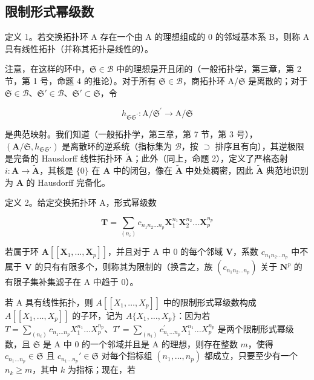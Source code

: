 \subsection{限制形式幂级数}

定义 1。若交换拓扑环 A 存在一个由 A 的理想组成的 0 的邻域基本系 B，则称 A 具有线性拓扑（并称其拓扑是线性的）。

注意，在这样的环中，\(\mathfrak{S} \in \mathcal{B}\) 中的理想是开且闭的（一般拓扑学，第三章，第 2 节，第 1 号，命题 4 的推论）。对于所有 \(\mathfrak{S} \in \mathcal{B}\)，商拓扑环 A/\(\mathfrak{S}\) 是离散的；对于 \(\mathfrak{S} \in \mathcal{B}\)、\(\mathfrak{S}' \in \mathcal{B}\)、\(\mathfrak{S}' \subset \mathfrak{S}\)，令

\[
h _ {\mathfrak {S S} ^ {\prime}} \colon \mathrm{A} / \mathfrak {S} ^ {\prime} \rightarrow \mathrm{A} / \mathfrak {S}
\]

是典范映射。我们知道（一般拓扑学，第三章，第 7 节，第 3 号），\((\mathbf{A} / \mathfrak{S}, h_{\mathfrak{S}\mathfrak{S}'})\) 是离散环的逆系统（指标集为 \(\mathcal{B}\)，按 \(\supset\) 排序且有向），其逆极限是完备的 Hausdorff 线性拓扑环 \(\tilde{\mathbf{A}}\)；此外（同上，命题 2），定义了严格态射 \(i: \mathbf{A} \to \tilde{\mathbf{A}}\)，其核是 \(\{0\}\) 在 \(\mathbf{A}\) 中的闭包，像在 \(\tilde{\mathbf{A}}\) 中处处稠密，因此 \(\tilde{\mathbf{A}}\) 典范地识别为 \(\mathbf{A}\) 的 Hausdorff 完备化。

定义 2。给定交换拓扑环 A，形式幂级数

\[
\mathbf {T} = \sum_ {(n _ {i})} c _ {n _ {1} n _ {2} \dots n _ {p}} \mathbf {X} _ {1} ^ {n _ {1}} \mathbf {X} _ {2} ^ {n _ {2}} \dots \mathbf {X} _ {p} ^ {n _ {p}}
\]

若属于环 \(\mathbf{A}[[\mathbf{X}_1,\ldots ,\mathbf{X}_p]]\)，并且对于 A 中 0 的每个邻域 \(\mathbf{V}\)，系数 \(c_{n_1n_2\dots n_p}\) 中不属于 \(\mathbf{V}\) 的只有有限多个，则称其为限制的（换言之，族 \((c_{n_1n_2\dots n_p})\) 关于 \(\mathbf{N}^p\) 的有限子集补集滤子在 A 中趋于 0）。

若 A 具有线性拓扑，则 \(A[[X_{1},\ldots,X_{p}]]\) 中的限制形式幂级数构成 \(A[[X_{1},\ldots,X_{p}]]\) 的子环，记为 \(A\{X_{1},\ldots,X_{p}\}\)：因为若 \(T=\sum_{(n_{i})}c_{n_{1}\ldots n_{p}}X_{1}^{n_{1}}\ldots X_{p}^{n_{p}}\)、\(T'=\sum_{(n_{i})}c_{n_{1}\ldots n_{p}}^{'}X_{1}^{n_{1}}\ldots X_{p}^{n_{p}}\) 是两个限制形式幂级数，且 \(\mathfrak{S}\) 是 A 中 0 的一个邻域并且是 A 的理想，则存在整数 \(m\)，使得 \(c_{n_1\ldots n_p} \in \mathfrak{S}\) 且 \(c_{n_1\ldots n_p}' \in \mathfrak{S}\) 对每个指标组 \((n_1, \ldots, n_p)\) 都成立，只要至少有一个 \(n_k \geqslant m\)，其中 \(k\) 为指标；现在，若

